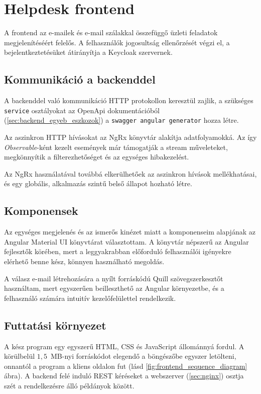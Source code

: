 \section{Helpdesk frontend}
A frontend az e-mailek és e-mail szálakkal összefüggő üzleti feladatok megjelenítéséért felelős. A felhasználók jogosultság ellenőrzését végzi el, a bejelentkeztetésüket átirányítja a Keycloak szervernek. 


\subsection{Kommunikáció a backenddel}
A backenddel való kommunikáció HTTP protokollon keresztül zajlik, a szükséges \texttt{service} osztályokat az OpenApi dokumentációból (\ref{sec:backend_egyeb_eszkozok}) a \texttt{swagger angular generator} hozza létre.

Az aszinkron HTTP hívásokat az NgRx könyvtár alakítja adatfolyamokká. 
Az így \emph{Observable}-ként kezelt események már támogatják a stream műveleteket, megkönnyítik a filterezhetőséget és az egységes hibakezelést. 

Az NgRx használatával továbbá elkerülhetőek az aszinkron hívások mellékhatásai, és egy globális, alkalmazás szintű belső állapot hozható létre.

\subsection{Komponensek}
Az egységes megjelenés és az ismerős kinézet miatt a komponenseim alapjának az Angular Material UI könyvtárat választottam. A könyvtár népszerű az Angular fejlesztők körében, mert a leggyakrabban előforduló felhasználói igényekre elérhető benne kész, könnyen használható megoldás.

A válasz e-mail létrehozására a nyílt forráskódú Quill szövegszerkesztőt használtam, mert egyszerűen beilleszthető az Angular környezetbe, és a felhasználó számára intuitív kezelőfelülettel rendelkezik.


\subsection{Futtatási környezet}
A kész program egy egyszerű HTML, CSS és JavaScript állománnyá fordul. A körülbelül $1,5$~MB-nyi forráskódot elegendő a böngészőbe egyszer letölteni, onnantól a program a kliens oldalon fut (lásd \ref{fig:frontend_sequence_diagram} ábra). A backend felé induló REST kéréseket a webszerver (\ref{sec:nginx}) osztja szét a rendelkezésre álló példányok között.

